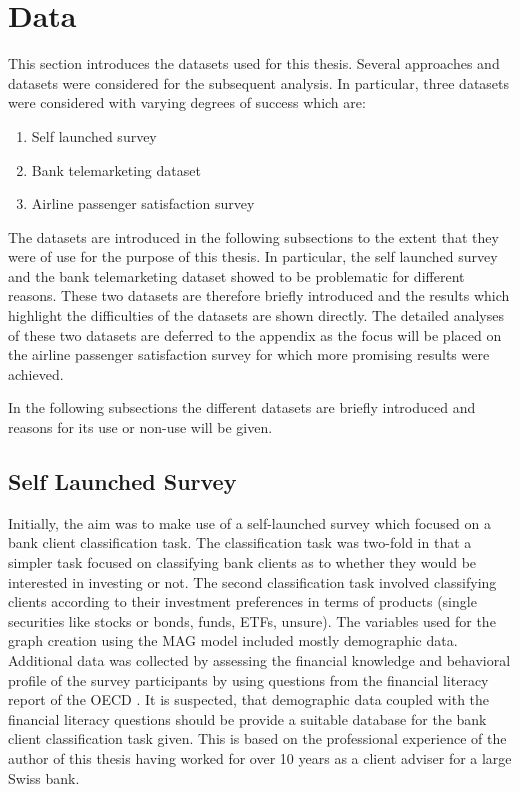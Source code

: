 
  \section{Data}
  
  This section introduces the datasets used for this thesis. Several approaches
  and datasets were considered for the subsequent analysis. In particular, three
  datasets were considered with varying degrees of success which are:

  \begin{enumerate}
    \item Self launched survey
    \item Bank telemarketing dataset
    \item Airline passenger satisfaction survey
  \end{enumerate}

  \noindent The datasets are introduced in the following subsections to the
  extent that they were of use for the purpose of this thesis. In particular,
  the self launched survey and the bank telemarketing dataset showed to be
  problematic for different reasons. These two datasets are therefore briefly
  introduced and the results which highlight the difficulties of the datasets
  are shown directly. The detailed analyses of these two datasets are deferred
  to the appendix as the focus will be placed on the airline passenger
  satisfaction survey for which more promising results were achieved. 


  In the following subsections the different datasets are briefly 
  introduced and reasons for its use or non-use will be given.

  \subsection{Self Launched Survey}
  \label{section:self_survey}

  Initially, the aim was to make use of a self-launched survey which focused on
  a bank client classification task. The classification task was two-fold in 
  that a simpler task focused on classifying bank clients as to whether they 
  would be interested in investing or not. The second classification task
  involved classifying clients according to their investment preferences in
  terms of products (single securities like stocks or bonds, funds, ETFs,
  unsure). The variables used for the graph creation using the MAG model
  included mostly demographic data. Additional data was collected by assessing
  the financial knowledge and behavioral profile of the survey participants by 
  using questions from the financial literacy report of the OECD \citep{OECD2017}.
  It is suspected, that demographic data coupled with the financial literacy
  questions should be provide a suitable database for the bank client
  classification task given. This is based on the professional experience of
  the author of this thesis having worked for over 10 years as a client adviser
  for a large Swiss bank. \\

